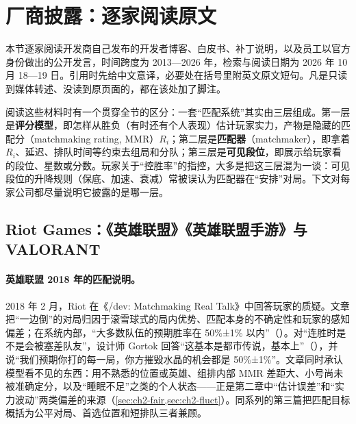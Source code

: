 
\section{厂商披露：逐家阅读原文}
\label{sec:ch1b-disclosure}

本节逐家阅读开发商自己发布的开发者博客、白皮书、补丁说明，以及员工以官方身份做出的公开发言，时间跨度为 2013—2026 年，检索与阅读日期为 2026 年 10 月 18—19 日。引用时先给中文意译，必要处在括号里附英文原文短句。凡是只读到媒体转述、没读到原页面的，都在该处加了脚注。

阅读这些材料时有一个贯穿全节的区分：一套“匹配系统”其实由三层组成。第一层是\textbf{评分模型}，即怎样从胜负（有时还有个人表现）估计玩家实力，产物是隐藏的匹配分（matchmaking rating, MMR）$R_i$；第二层是\textbf{匹配器}（matchmaker），即拿着 $R_i$、延迟、排队时间等约束去组局和分队；第三层是\textbf{可见段位}，即展示给玩家看的段位、星数或分数。玩家关于“控胜率”的指控，大多是把这三层混为一谈：可见段位的升降规则（保底、加速、衰减）常被误认为匹配器在“安排”对局。下文对每家公司都尽量说明它披露的是哪一层。

\subsection{Riot Games：《英雄联盟》《英雄联盟手游》与 VALORANT}
\label{sec:ch1b-riot}

\paragraph{英雄联盟 2018 年的匹配说明。}
2018 年 2 月，Riot 在《/dev: Matchmaking Real Talk》中回答玩家的质疑\cite{riot2018matchmaking}。文章把“一边倒”的对局归因于滚雪球式的局内优势、匹配本身的不确定性和玩家的感知偏差；在系统内部，“大多数队伍的预期胜率在 50\%±1\% 以内”（）\tagOff。对“连胜时是不是会被塞差队友”，设计师 Gortok 回答“这基本是都市传说，基本上”（），并说“我们预期你打的每一局，你方摧毁水晶的机会都是 50\%±1\%”\tagOff。文章同时承认模型看不见的东西：用不熟悉的位置或英雄、组排内部 MMR 差距大、小号尚未被准确定分，以及“睡眠不足”之类的个人状态\tagOff——正是第二章中“估计误差”和“实力波动”两类偏差的来源（\cref{sec:ch2-fair,sec:ch2-fluct}）。同系列的第三篇把匹配目标概括为公平对局、首选位置和短排队三者兼顾\cite{riot2018making}\tagOff。

